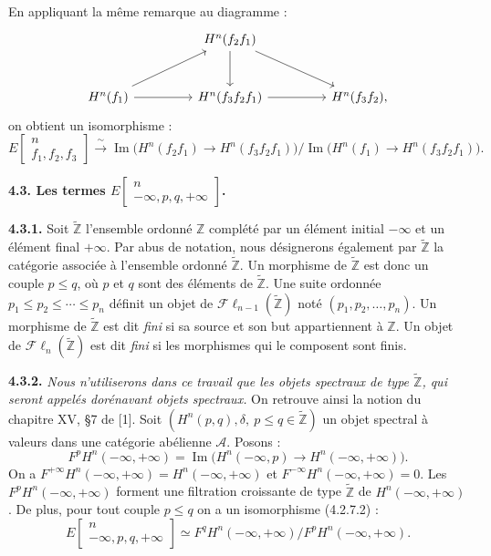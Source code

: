 \clearpage
{}%
\begingroup\small\setlength{\parskip}{0pt}\setlength{\emergencystretch}{2.5em}
En appliquant la même remarque au diagramme :
\[
\begin{tikzcd}[column sep=4.6em,row sep=2.8em]
&H^n(f_2f_1)\arrow[d]\arrow[dr]&\\
H^n(f_1)\arrow[ur]\arrow[r]&
H^n(f_3f_2f_1)\arrow[r]&H^n(f_3f_2),
\end{tikzcd}
\]
on obtient un isomorphisme :
\[
E\!\begin{bmatrix}n\\ f_1,f_2,f_3\end{bmatrix}
\xrightarrow{\ \sim\ }
\operatorname{Im}\bigl(H^n(f_2f_1)\longrightarrow H^n(f_3f_2f_1)\bigr)
\Big/
\operatorname{Im}\bigl(H^n(f_1)\longrightarrow H^n(f_3f_2f_1)\bigr).
\tag{4.2.7.2}
\]

\medskip\noindent\textbf{4.3. Les termes
$E\!\begin{bmatrix}n\\ -\infty,p,q,+\infty\end{bmatrix}$.}

\medskip\noindent\textbf{4.3.1.}
Soit $\widetilde{\mathbb Z}$ l'ensemble ordonné $\mathbb Z$ complété par un
élément initial $-\infty$ et un élément final $+\infty$. Par abus de
notation, nous désignerons également par $\widetilde{\mathbb Z}$ la
catégorie associée à l'ensemble ordonné $\widetilde{\mathbb Z}$. Un
morphisme de $\widetilde{\mathbb Z}$ est donc un couple $p\leq q$, où $p$
et $q$ sont des éléments de $\widetilde{\mathbb Z}$. Une suite ordonnée
$p_1\leq p_2\leq\cdots\leq p_n$ définit un objet de
$\mathcal{F}\ell_{n-1}(\widetilde{\mathbb Z})$ noté
$(p_1,p_2,\ldots,p_n)$. Un morphisme de $\widetilde{\mathbb Z}$ est dit
\textit{fini} si sa source et son but appartiennent à $\mathbb Z$. Un objet
de $\mathcal{F}\ell_n(\widetilde{\mathbb Z})$ est dit \textit{fini} si les
morphismes qui le composent sont finis.

\medskip\noindent\textbf{4.3.2.}
\textit{Nous n'utiliserons dans ce travail que les objets spectraux de type
$\widetilde{\mathbb Z}$, qui seront appelés dorénavant objets spectraux.}
On retrouve ainsi la notion du chapitre XV, §7 de [1]. Soit
$(H^n(p,q),\delta,\ p\leq q\in\widetilde{\mathbb Z})$ un objet spectral à
valeurs dans une catégorie abélienne $\mathcal A$. Posons :
\[
F^pH^n(-\infty,+\infty)
=\operatorname{Im}\bigl(H^n(-\infty,p)\longrightarrow
H^n(-\infty,+\infty)\bigr).
\tag{4.3.2.1}
\]
On a $F^{+\infty}H^n(-\infty,+\infty)=H^n(-\infty,+\infty)$ et
$F^{-\infty}H^n(-\infty,+\infty)=0$. Les
$F^pH^n(-\infty,+\infty)$ forment une filtration croissante de type
$\widetilde{\mathbb Z}$ de $H^n(-\infty,+\infty)$. De plus, pour tout
couple $p\leq q$ on a un isomorphisme (4.2.7.2) :
\[
E\!\begin{bmatrix}n\\ -\infty,p,q,+\infty\end{bmatrix}
\simeq
F^qH^n(-\infty,+\infty)\big/F^pH^n(-\infty,+\infty).
\]
\endgroup
